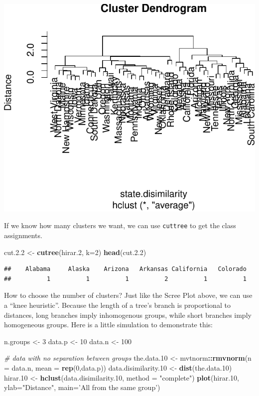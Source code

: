 \documentclass[]{book}
\newenvironment{Shaded}{\begin{snugshade}}{\end{snugshade}}
\newcommand{\CommentTok}[1]{\textcolor[rgb]{0.56,0.35,0.01}{\textit{#1}}}
\newcommand{\DataTypeTok}[1]{\textcolor[rgb]{0.13,0.29,0.53}{#1}}
\newcommand{\DecValTok}[1]{\textcolor[rgb]{0.00,0.00,0.81}{#1}}
\newcommand{\FloatTok}[1]{\textcolor[rgb]{0.00,0.00,0.81}{#1}}
\newcommand{\KeywordTok}[1]{\textcolor[rgb]{0.13,0.29,0.53}{\textbf{#1}}}
\newcommand{\NormalTok}[1]{#1}
\newcommand{\OperatorTok}[1]{\textcolor[rgb]{0.81,0.36,0.00}{\textbf{#1}}}
\newcommand{\StringTok}[1]{\textcolor[rgb]{0.31,0.60,0.02}{#1}}
\theoremstyle{definition}
\theoremstyle{definition}
\theoremstyle{definition}
\theoremstyle{remark}
\begin{document}
\includegraphics[width=0.5\linewidth]{Rcourse_files/figure-latex/average linkage-1}

If we know how many clusters we want, we can use \texttt{cuttree} to get the class assignments.

\begin{Shaded}
\begin{Highlighting}[]
\NormalTok{cut.}\FloatTok{2.2}\NormalTok{ <-}\StringTok{ }\KeywordTok{cutree}\NormalTok{(hirar}\FloatTok{.2}\NormalTok{, }\DataTypeTok{k=}\DecValTok{2}\NormalTok{)}
\KeywordTok{head}\NormalTok{(cut.}\FloatTok{2.2}\NormalTok{)}
\end{Highlighting}
\end{Shaded}

\begin{verbatim}
##    Alabama     Alaska    Arizona   Arkansas California   Colorado 
##          1          1          1          2          1          1
\end{verbatim}

How to choose the number of clusters?
Just like the Scree Plot above, we can use a ``knee heuristic''.
Because the length of a tree's branch is proportional to distances, long branches imply inhomogenous groups, while short branches imply homogeneous groups.
Here is a little simulation to demonstrate this:

\begin{Shaded}
\begin{Highlighting}[]
\NormalTok{n.groups <-}\StringTok{ }\DecValTok{3}
\NormalTok{data.p <-}\StringTok{ }\DecValTok{10}
\NormalTok{data.n <-}\StringTok{ }\DecValTok{100}

\CommentTok{# data with no separation between groups}
\NormalTok{the.data}\FloatTok{.10}\NormalTok{ <-}\StringTok{ }\NormalTok{mvtnorm}\OperatorTok{::}\KeywordTok{rmvnorm}\NormalTok{(}\DataTypeTok{n =}\NormalTok{ data.n, }\DataTypeTok{mean =} \KeywordTok{rep}\NormalTok{(}\DecValTok{0}\NormalTok{,data.p))  }
\NormalTok{data.disimilarity}\FloatTok{.10}\NormalTok{ <-}\StringTok{ }\KeywordTok{dist}\NormalTok{(the.data}\FloatTok{.10}\NormalTok{)}
\NormalTok{hirar}\FloatTok{.10}\NormalTok{ <-}\StringTok{ }\KeywordTok{hclust}\NormalTok{(data.disimilarity}\FloatTok{.10}\NormalTok{, }\DataTypeTok{method =} \StringTok{"complete"}\NormalTok{)}
\KeywordTok{plot}\NormalTok{(hirar}\FloatTok{.10}\NormalTok{, }\DataTypeTok{ylab=}\StringTok{"Distance"}\NormalTok{, }\DataTypeTok{main=}\StringTok{'All from the same group'}\NormalTok{)}
\end{Highlighting}
\end{Shaded}
\end{document}
